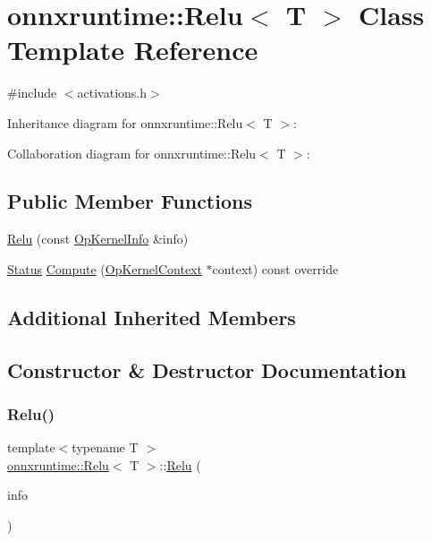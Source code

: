 \hypertarget{classonnxruntime_1_1Relu}{}\section{onnxruntime\+:\+:Relu$<$ T $>$ Class Template Reference}
\label{classonnxruntime_1_1Relu}


{\ttfamily \#include $<$activations.\+h$>$}



Inheritance diagram for onnxruntime\+:\+:Relu$<$ T $>$\+:


Collaboration diagram for onnxruntime\+:\+:Relu$<$ T $>$\+:
\subsection*{Public Member Functions}
\begin{DoxyCompactItemize}
\item 
\mbox{\hyperlink{classonnxruntime_1_1Relu_a874e2821c85e6b135b2139761be3451f}{Relu}} (const \mbox{\hyperlink{classonnxruntime_1_1OpKernelInfo}{Op\+Kernel\+Info}} \&info)
\item 
\mbox{\hyperlink{classonnxruntime_1_1common_1_1Status}{Status}} \mbox{\hyperlink{classonnxruntime_1_1Relu_a1e77cc4de86c018e0bf4fcdcaa92ab21}{Compute}} (\mbox{\hyperlink{classonnxruntime_1_1OpKernelContext}{Op\+Kernel\+Context}} $\ast$context) const override
\end{DoxyCompactItemize}
\subsection*{Additional Inherited Members}


\subsection{Constructor \& Destructor Documentation}
\mbox{\label{classonnxruntime_1_1Relu_a874e2821c85e6b135b2139761be3451f}} 
\subsubsection{\texorpdfstring{Relu()}{Relu()}}
{\footnotesize\ttfamily template$<$typename T $>$ \\
\mbox{\hyperlink{classonnxruntime_1_1Relu}{onnxruntime\+::\+Relu}}$<$ T $>$\+::\mbox{\hyperlink{classonnxruntime_1_1Relu}{Relu}} (\begin{DoxyParamCaption}\item[{const \mbox{\hyperlink{classonnxruntime_1_1OpKernelInfo}{Op\+Kernel\+Info}} \&}]{info }\end{DoxyParamCaption})\hspace{0.3cm}{\ttfamily [inline]}}



